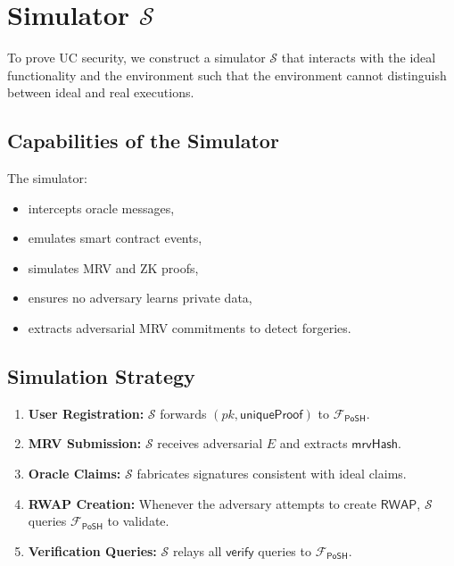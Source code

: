 \documentclass[11pt,a4paper]{report}
\theoremstyle{definition}
\theoremstyle{remark}
\begin{document}
\section{Simulator \texorpdfstring{$\mathcal{S}$}{S}}

To prove UC security, we construct a simulator $\mathcal{S}$ that interacts with
the ideal functionality and the environment such that the environment cannot
distinguish between ideal and real executions.

\subsection*{Capabilities of the Simulator}

The simulator:

\begin{itemize}[leftmargin=*]
  \item intercepts oracle messages,
  \item emulates smart contract events,
  \item simulates MRV and ZK proofs,
  \item ensures no adversary learns private data,
  \item extracts adversarial MRV commitments to detect forgeries.
\end{itemize}

\subsection*{Simulation Strategy}

\begin{enumerate}[label=\arabic*.,leftmargin=*]
  \item \textbf{User Registration:}  
    $\mathcal{S}$ forwards $(pk, \mathsf{uniqueProof})$ to $\mathcal{F}_{\textsf{PoSH}}$.
  \item \textbf{MRV Submission:}  
    $\mathcal{S}$ receives adversarial $E$ and extracts $\mathsf{mrvHash}$.
  \item \textbf{Oracle Claims:}  
    $\mathcal{S}$ fabricates signatures consistent with ideal claims.
  \item \textbf{RWAP Creation:}  
    Whenever the adversary attempts to create $\mathsf{RWAP}$,  
    $\mathcal{S}$ queries $\mathcal{F}_{\textsf{PoSH}}$ to validate.
  \item \textbf{Verification Queries:}  
    $\mathcal{S}$ relays all $\textsf{verify}$ queries to $\mathcal{F}_{\textsf{PoSH}}$.
\end{enumerate}
\end{document}
